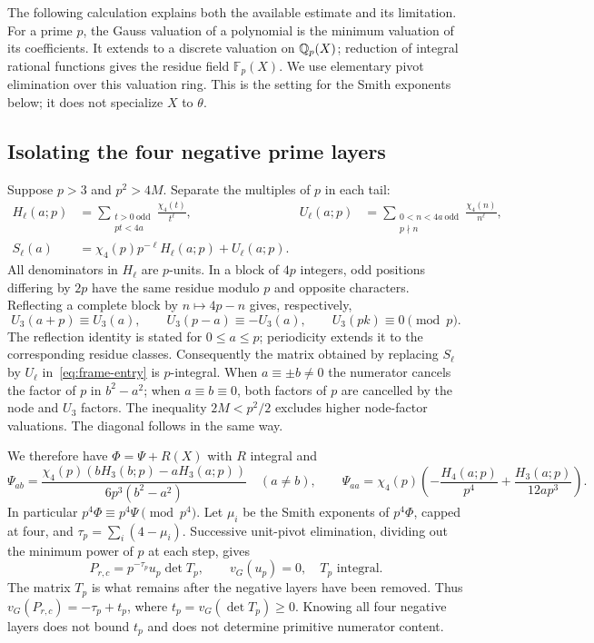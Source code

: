 The following calculation explains both the available estimate and
its limitation. For a prime $p$, the Gauss valuation of a polynomial
is the minimum valuation of its coefficients. It extends to a discrete
valuation on $\mathbb Q_p(X)$; reduction of integral rational functions gives
the residue field $\mathbb F_p(X)$. We use elementary pivot elimination
over this valuation ring. This is the setting for the Smith exponents
below; it does not specialize $X$ to $\theta$.

\subsection{Isolating the four negative prime layers}
Suppose $p>3$ and $p^2>4M$. Separate the multiples of $p$ in each tail:
\begin{align*}
 H_\ell(a;p)&=\sum_{\substack{t>0\ \text{odd}\\pt<4a}}
                  \frac{\chi_4(t)}{t^\ell},&
 U_\ell(a;p)&=\sum_{\substack{0<n<4a\ \text{odd}\\p\nmid n}}
                  \frac{\chi_4(n)}{n^\ell},\\
 S_\ell(a)&=\chi_4(p)p^{-\ell}H_\ell(a;p)+U_\ell(a;p).
\end{align*}
All denominators in $H_\ell$ are $p$-units. In a block of $4p$
integers, odd positions differing by $2p$ have the same residue modulo
$p$ and opposite characters. Reflecting a complete block by
$n\mapsto4p-n$ gives, respectively,
\[
 U_3(a+p)\equiv U_3(a),\qquad
 U_3(p-a)\equiv-U_3(a),\qquad U_3(pk)\equiv0\pmod p.
\]
The reflection identity is stated for $0\leq a\leq p$; periodicity
extends it to the corresponding residue classes.
Consequently the matrix obtained by replacing $S_\ell$ by $U_\ell$
in~\eqref{eq:frame-entry} is $p$-integral. When $a\equiv\pm b\ne0$
the numerator cancels the factor of $p$ in $b^2-a^2$; when
$a\equiv b\equiv0$, both factors of $p$ are cancelled by the node
and $U_3$ factors. The inequality $2M<p^2/2$ excludes higher node-factor
valuations. The diagonal follows in the same way.

We therefore have $\Phi=\Psi+R(X)$ with $R$ integral and
\[
 \Psi_{ab}=\frac{\chi_4(p)(bH_3(b;p)-aH_3(a;p))}
                    {6p^3(b^2-a^2)}\quad(a\ne b),\qquad
 \Psi_{aa}=\chi_4(p)\left(-\frac{H_4(a;p)}{p^4}
                              +\frac{H_3(a;p)}{12ap^3}\right).
\]
In particular $p^4\Phi\equiv p^4\Psi\pmod{p^4}$.
Let $\mu_i$ be the Smith exponents of $p^4\Phi$, capped at four,
and $\tau_p=\sum_i(4-\mu_i)$. Successive unit-pivot elimination,
dividing out the minimum power of $p$ at each step, gives
\begin{equation}\label{eq:frame-residual}
 P_{r,c}=p^{-\tau_p}u_p\det T_p,
 \qquad v_G(u_p)=0,\quad T_p\text{ integral}.
\end{equation}
The matrix $T_p$ is what remains after the negative layers have been
removed. Thus $v_G(P_{r,c})=-\tau_p+t_p$, where
$t_p=v_G(\det T_p)\geq0$. Knowing all four negative layers does not
bound $t_p$ and does not determine primitive numerator content.

